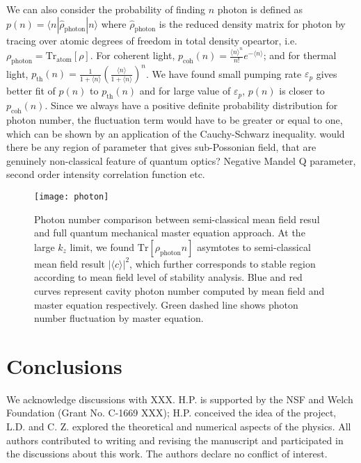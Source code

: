 \documentclass[journal,article,accept,moreauthors,pdftex,12pt,a4paper]{mdpi}
\begin{document}
We can also consider the probability of finding $n$ photon is defined as $p(n)=\langle n|\hat{\rho}_{\text{photon}}|n\rangle$ where $\hat{\rho}_{\text{photon}}$ is the reduced density matrix for photon by tracing over atomic degrees of freedom in total density opeartor, i.e. $\rho_{\text{photon}}=\text{Tr}_{\text{atom}}[\rho]$. For coherent light, $p_{\text{coh}}(n)=\frac{\langle n\rangle^{n}}{n!}e^{-\langle n\rangle}$; and for thermal light, $p_{\text{th}}(n)=\frac{1}{1+\langle n\rangle}(\frac{\langle n\rangle}{1+\langle n\rangle})^{n}$. We have found small pumping rate $\varepsilon_p$ gives better fit of $p(n)$ to  $p_{\text{th}}(n)$ and for large value of $\varepsilon_p$, $p(n)$ is closer to $p_{\text{coh}}(n)$. Since we always have a positive definite probability distribution for photon number, the fluctuation term would have to be greater or equal to one, which can be shown by an application of the Cauchy-Schwarz inequality. {\color{red} would there be any region of parameter that gives sub-Possonian field, that are genuinely non-classical feature of quantum optics? Negative Mandel Q parameter, second order intensity correlation function etc.}



\begin{figure}[htp]
\texttt{[image: photon]}
\caption{ Photon number comparison between semi-classical mean field resul and full quantum mechanical master equation approach. At the large $k_z$ limit, we found $\text{Tr}[\rho_\text{photon}n]$ asymtotes to semi-classical mean field result $|\langle c\rangle|^2$, which further corresponds to stable region according to mean field level of stability analysis. Blue and red curves represent cavity photon number computed by mean field and master equation respectively. Green dashed line shows photon number fluctuation by master equation.}
\label{photon}
\end{figure}



\section{Conclusions} \label{conclusion}


We acknowledge discussions with XXX. H.P. is supported by the NSF and Welch Foundation (Grant No. C-1669 XXX);
H.P. conceived the idea of the project, L.D. and C. Z. explored the theoretical and numerical aspects of the physics. All authors contributed to writing and revising the manuscript and participated in the discussions about this work.
The authors declare no conflict of interest. 
\end{document}
